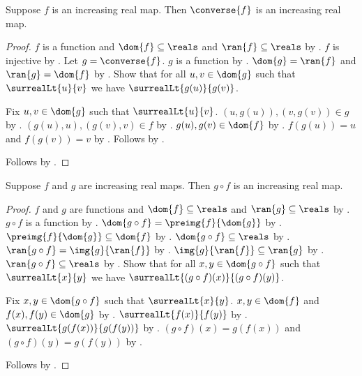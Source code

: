 \begin{theorem}\label{increasing_real_map_converse}
    Suppose $f$ is an increasing real map.
    Then $\converse{f}$ is an increasing real map.
\end{theorem}
\begin{proof}
    $f$ is a function and $\dom{f}\subseteq\reals$ and $\ran{f}\subseteq\reals$ by
        .
    $f$ is injective by .
    Let $g=\converse{f}$.
    $g$ is a function by .
    $\dom{g}=\ran{f}$ and $\ran{g}=\dom{f}$ by .
    Show that for all $u,v\in\dom{g}$ such that $\surrealLt{u}{v}$ we have
        $\surrealLt{g(u)}{g(v)}$.
    \begin{subproof}
        Fix $u,v\in\dom{g}$ such that $\surrealLt{u}{v}$.
        $(u,g(u)),(v,g(v))\in g$ by .
        $(g(u),u),(g(v),v)\in f$ by .
        $g(u),g(v)\in\dom{f}$ by .
        $f(g(u))=u$ and $f(g(v))=v$ by .
        Follows by .
    \end{subproof}
    Follows by .
\end{proof}

\begin{theorem}\label{increasing_real_map_composition}
    Suppose $f$ and $g$ are increasing real maps.
    Then $g\circ f$ is an increasing real map.
\end{theorem}
\begin{proof}
    $f$ and $g$ are functions and $\dom{f}\subseteq\reals$ and $\ran{g}\subseteq\reals$
        by .
    $g\circ f$ is a function by .
    $\dom{g\circ f}=\preimg{f}{\dom{g}}$ by .
    $\preimg{f}{\dom{g}}\subseteq\dom{f}$ by .
    $\dom{g\circ f}\subseteq\reals$ by .
    $\ran{g\circ f}=\img{g}{\ran{f}}$ by .
    $\img{g}{\ran{f}}\subseteq\ran{g}$ by .
    $\ran{g\circ f}\subseteq\reals$ by .
    Show that for all $x,y\in\dom{g\circ f}$ such that $\surrealLt{x}{y}$ we have
        $\surrealLt{(g\circ f)(x)}{(g\circ f)(y)}$.
    \begin{subproof}
        Fix $x,y\in\dom{g\circ f}$ such that $\surrealLt{x}{y}$.
        $x,y\in\dom{f}$ and $f(x),f(y)\in\dom{g}$ by
            .
        $\surrealLt{f(x)}{f(y)}$ by .
        $\surrealLt{g(f(x))}{g(f(y))}$ by .
        $(g\circ f)(x)=g(f(x))$ and $(g\circ f)(y)=g(f(y))$ by
            .
    \end{subproof}
    Follows by .
\end{proof}
